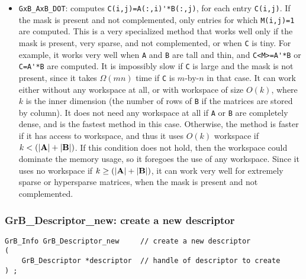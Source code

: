 \documentclass[12pt]{article}
\begin{document}
\begin{itemize}
\begin{itemize}
    \item \verb'GxB_AxB_DOT': computes \verb"C(i,j)=A(:,i)'*B(:,j)", for each
    entry \verb'C(i,j)'.  If the mask is present and not complemented, only
    entries for which \verb'M(i,j)=1' are computed.  This is a very specialized
    method that works well only if the mask is present, very sparse, and not
    complemented, or when \verb'C' is tiny.  For example, it works very well
    when \verb'A' and \verb'B' are tall and thin, and \verb"C<M>=A'*B" or
    \verb"C=A'*B" are computed.  It is impossibly slow if \verb'C' is large and
    the mask is not present, since it takes $\Omega(mn)$ time if \verb'C' is
    $m$-by-$n$ in that case.  It can work either without any workspace at all,
    or with workspace of size $O(k)$, where $k$ is the inner dimension (the
    number of rows of \verb'B' if the matrices are stored by column).
    It does not need any workspace at all if \verb'A' or \verb'B' are
    completely dense, and is the fastest method in this case.  Otherwise, the
    method is faster if it has access to workspace, and thus it uses $O(k)$
    workspace if $k < (|{\bf A}|+|{\bf B}|)$.  If this condition does not hold,
    then the workspace could dominate the memory usage, so it foregoes the use
    of any workspace.  Since it uses no workspace if $k \ge (|{\bf A}|+|{\bf
    B}|)$, it can work very well for extremely sparse or hypersparse matrices,
    when the mask is present and not complemented.

    \end{itemize}

\end{itemize}

\subsubsection{{\sf GrB\_Descriptor\_new:}  create a new descriptor}
\label{descriptor_new}

\begin{mdframed}[userdefinedwidth=6in]
{\footnotesize
\begin{verbatim}
GrB_Info GrB_Descriptor_new     // create a new descriptor
(
    GrB_Descriptor *descriptor  // handle of descriptor to create
) ;
\end{verbatim} } \end{mdframed}
\end{document}
